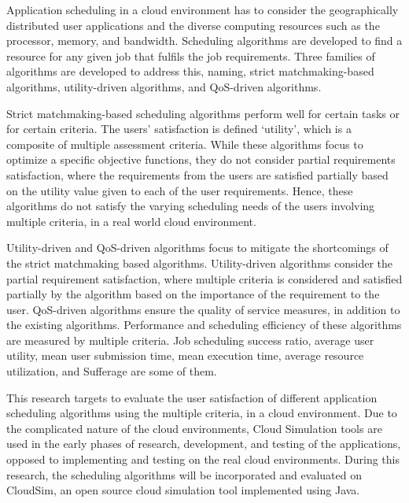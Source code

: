 \documentclass[times, 10pt,twocolumn]{article}
\begin{document}
Application scheduling in a cloud environment has to consider the geographically distributed user applications and the diverse computing resources such as the processor, memory, and bandwidth. Scheduling algorithms are developed to find a resource for any given job that fulfils the job requirements. Three families of algorithms are developed to address this, naming, strict matchmaking-based algorithms, utility-driven algorithms, and QoS-driven algorithms.

Strict matchmaking-based scheduling algorithms perform well for certain tasks or for certain criteria. The users' satisfaction is defined `utility', which is a composite of multiple assessment criteria. While these algorithms focus to optimize a specific objective functions, they do not consider partial requirements satisfaction, where the requirements from the users are satisfied partially based on the utility value given to each of the user requirements\cite{resumo}. Hence, these algorithms do not satisfy the varying scheduling needs of the users involving multiple criteria, in a real world cloud environment. 

Utility-driven and QoS-driven algorithms focus to mitigate the shortcomings of the strict matchmaking based algorithms. Utility-driven algorithms consider the partial requirement satisfaction, where multiple criteria is considered and satisfied partially by the algorithm based on the importance of the requirement to the user. QoS-driven algorithms ensure the quality of service measures, in addition to the existing algorithms. Performance and scheduling efficiency of these algorithms are measured by multiple criteria. Job scheduling success ratio, average user utility, mean user submission time, mean execution time, average resource utilization, and Sufferage are some of them. 

This research targets to evaluate the user satisfaction of different application scheduling algorithms using the multiple criteria, in a cloud environment. Due to the complicated nature of the cloud environments, Cloud Simulation tools are used in the early phases of research, development, and testing of the applications, opposed to implementing and testing on the real cloud environments. During this research, the scheduling algorithms will be incorporated and evaluated on CloudSim\cite{cloudsim}, an open source cloud simulation tool implemented using Java. 
\end{document}
